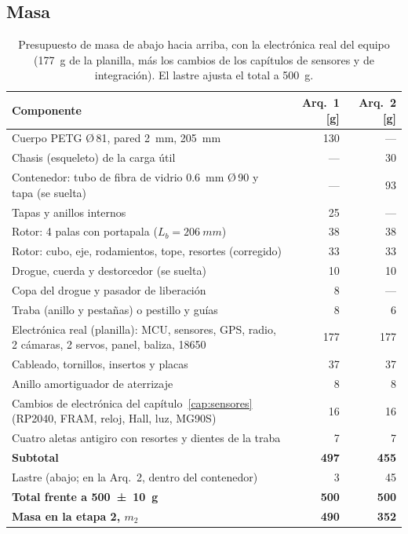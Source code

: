 \subsection{Masa}
\begin{table}[H]
\centering\small
\caption{Presupuesto de masa de abajo hacia arriba, con la electrónica real del equipo
(\SI{177}{g} de la planilla, más los cambios de los capítulos de sensores y de integración). El lastre ajusta el total a \SI{500}{g}.}\label{tab:masa}
\begin{tabularx}{\textwidth}{@{}Yrr@{}}
\toprule
\textbf{Componente} & \textbf{Arq.~1} [g] & \textbf{Arq.~2} [g]\\\midrule
Cuerpo PETG Ø\,81, pared \SI{2}{mm}, \SI{205}{mm}          & 130 & ---\\
Chasis (esqueleto) de la carga útil                        & --- & 30\\
Contenedor: tubo de fibra de vidrio \SI{0.6}{mm} Ø\,90 y tapa (se suelta) & --- & 93\\
Tapas y anillos internos                                   & 25 & ---\\
Rotor: 4 palas con portapala ($L_b=\SI{206}{mm}$)          & 38 & 38\\
Rotor: cubo, eje, rodamientos, tope, resortes (corregido) & 33 & 33\\
Drogue, cuerda y destorcedor (se suelta)                   & 10 & 10\\
Copa del drogue y pasador de liberación                    & 8 & ---\\
Traba (anillo y pestañas) o pestillo y guías               & 8 & 6\\
Electrónica real (planilla): MCU, sensores, GPS, radio, 2 cámaras, 2 servos, panel, baliza, 18650 & 177 & 177\\
Cableado, tornillos, insertos y placas                     & 37 & 37\\
Anillo amortiguador de aterrizaje                          & 8 & 8\\
Cambios de electrónica del capítulo~\ref{cap:sensores} (RP2040, FRAM, reloj, Hall, luz, MG90S) & 16 & 16\\
Cuatro aletas antigiro con resortes y dientes de la traba  & 7 & 7\\\midrule
\textbf{Subtotal}                                          & \textbf{497} & \textbf{455}\\
Lastre (abajo; en la Arq.~2, dentro del contenedor)        & 3 & 45\\
\textbf{Total frente a \SI{500 \pm 10}{g}}                 & \textbf{500} & \textbf{500}\\
\textbf{Masa en la etapa 2, $m_2$}                         & \textbf{490} & \textbf{352}\\
\bottomrule
\end{tabularx}
\end{table}

